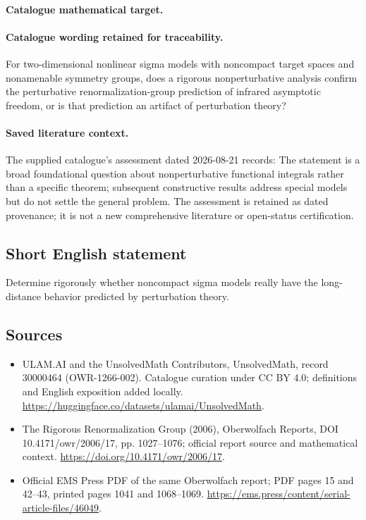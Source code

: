 \documentclass[11pt]{article}
\begin{document}
\paragraph{Catalogue mathematical target.}
\paragraph{Catalogue wording retained for traceability.}
For two-dimensional nonlinear sigma models with noncompact target spaces and nonamenable symmetry groups, does a rigorous nonperturbative analysis confirm the perturbative renormalization-group prediction of infrared asymptotic freedom, or is that prediction an artifact of perturbation theory?

\paragraph{Saved literature context.} The supplied catalogue's assessment dated 2026-08-21 records: The statement is a broad foundational question about nonperturbative functional integrals rather than a specific theorem; subsequent constructive results address special models but do not settle the general problem. The assessment is retained as dated provenance; it is not a new comprehensive literature or open-status certification.
\subsection{Short English statement}
Determine rigorously whether noncompact sigma models really have the long-distance behavior predicted by perturbation theory.
\subsection{Sources}
\begin{itemize}
\item[\hypertarget{source:30000464:1}{S1}] ULAM.AI and the UnsolvedMath Contributors, UnsolvedMath, record 30000464 (OWR-1266-002). Catalogue curation under CC BY 4.0; definitions and English exposition added locally.
\url{https://huggingface.co/datasets/ulamai/UnsolvedMath}.
\item[\hypertarget{source:30000464:2}{S2}] The Rigorous Renormalization Group (2006), Oberwolfach Reports, DOI 10.4171/owr/2006/17, pp. 1027--1076; official report source and mathematical context.
\url{https://doi.org/10.4171/owr/2006/17}.
\item[\hypertarget{source:30000464:3}{S3}] Official EMS Press PDF of the same Oberwolfach report; PDF pages 15 and 42--43, printed pages 1041 and 1068--1069.
\url{https://ems.press/content/serial-article-files/46049}.
\end{itemize}
\label{end:30000464}
\end{document}
